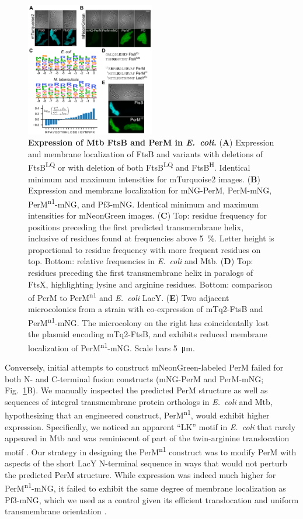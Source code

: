 \documentclass[pdflatex,sn-basic]{sn-jnl}%
\newcommand\ec{\textit{E.~coli}}
\newcommand\mtb{Mtb}
\newcommand\ftsbLQ{FtsB\textsuperscript{LQ}}
\newcommand\ftsbH{FtsB\textsuperscript{H}}
\newcommand\permN{PerM\textsuperscript{n1}}
\begin{document}
\begin{figure}[h]
    \centering
    \includegraphics[width=0.5\textwidth]{../figures/fig2.png}
    \caption{
        \textbf{Expression of \mtb{} FtsB and PerM in \ec{}.}
        (\textbf{A}) Expression and membrane localization of FtsB and variants with deletions of \ftsbLQ{} or with deletion of both \ftsbLQ{} and \ftsbH{}. Identical minimum and maximum intensities for mTurquoise2 images.
        (\textbf{B}) Expression and membrane localization for mNG-PerM, PerM-mNG, \permN{}-mNG, and Pf3-mNG. Identical minimum and maximum intensities for mNeonGreen images.
        (\textbf{C}) Top: residue frequency for positions preceding the first predicted transmembrane helix, inclusive of residues found at frequencies above \qty{5}{\percent}. Letter height is proportional to residue frequency with more frequent residues on top. Bottom: relative frequencies in \ec{} and \mtb{}.
        (\textbf{D}) Top: residues preceding the first transmembrane helix in paralogs of FtsX, highlighting lysine and arginine residues. Bottom: comparison of PerM to \permN{} and \ec{} LacY.
        (\textbf{E}) Two adjacent microcolonies from a strain with co-expression of mTq2-FtsB and \permN{}-mNG. The microcolony on the right has coincidentally lost the plasmid encoding mTq2-FtsB, and exhibits reduced membrane localization of \permN{}-mNG. Scale bars \qty{5}{\um}.
    }\label{fig2}
\end{figure}

Conversely, initial attempts to construct mNeonGreen-labeled PerM failed for both N- and C-terminal fusion constructs (mNG-PerM and PerM-mNG; Fig.~\ref{fig2}B).
We manually inspected the predicted PerM structure as well as sequences of integral transmembrane protein orthologs in \ec{} and \mtb{}, hypothesizing that an engineered construct, \permN{}, would exhibit higher expression.
Specifically, we noticed an apparent ``LK'' motif in \ec{} that rarely appeared in \mtb{} and was reminiscent of part of the twin-arginine translocation motif \citep{leeBacterialTwinArginineTranslocation2006}.
Our strategy in designing the \permN{} construct was to modify PerM with aspects of the short LacY N-terminal sequence in ways that would not perturb the predicted PerM structure.
While expression was indeed much higher for \permN{}-mNG, it failed to exhibit the same degree of membrane localization as Pf3-mNG, which we used as a control given its efficient translocation and uniform transmembrane orientation \citep{kieferNegativelyChargedAmino1997}.
\end{document}
